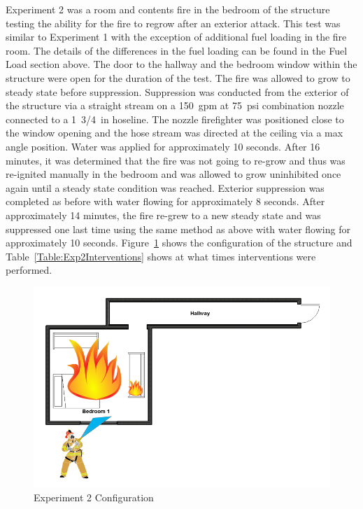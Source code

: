 \documentclass[12pt,oneside]{book}
\begin{document}
Experiment 2 was a room and contents fire in the bedroom of the structure testing the ability for the fire to regrow after an exterior attack. This test was similar to Experiment 1 with the exception of additional fuel loading in the fire room. The details of the differences in the fuel loading can be found in the Fuel Load section above. The door to the hallway and the bedroom window within the structure were open for the duration of the test. The fire was allowed to grow to steady state before suppression. Suppression was conducted from the exterior of the structure via a straight stream on a 150~gpm at 75~psi combination nozzle connected to a 1~3/4~in hoseline. The nozzle firefighter was positioned close to the window opening and the hose stream was directed at the ceiling via a max angle position. Water was applied for approximately 10 seconds. After 16 minutes, it was determined that the fire was not going to re-grow and thus was re-ignited manually in the bedroom and was allowed to grow uninhibited once again until a steady state condition was reached. Exterior suppression was completed as before with water flowing for approximately 8 seconds. After approximately 14 minutes, the fire re-grew to a new steady state and was suppressed one last time using the same method as above with water flowing for approximately 10 seconds. Figure~\ref{fig:Exp2Config} shows the configuration of the structure and Table~\ref{Table:Exp2Interventions} shows at what times interventions were performed.  


\begin{figure}[H]
	\centering
	\includegraphics[width=5in]{Howard_Exp_2.png}
	\caption{Experiment 2 Configuration}
	\label{fig:Exp2Config}
\end{figure}
\end{document}
